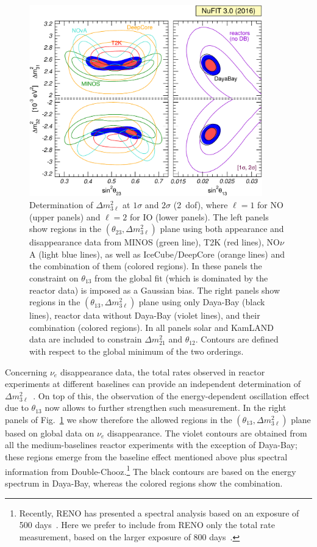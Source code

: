\documentclass[a4paper, 11pt]{article}
\newcommand{\Dmq}{\Delta m^2}
\begin{document}
\begin{figure}\centering
\includegraphics[width=0.9\textwidth]{fig-region-sample}
  \caption{Determination of $\Dmq_{3\ell}$ at $1\sigma$ and $2\sigma$
    (2~dof), where $\ell=1$ for NO (upper panels) and $\ell=2$ for IO
    (lower panels). The left panels show regions in the $(\theta_{23},
    \Dmq_{3\ell})$ plane using both appearance and disappearance data
    from MINOS (green line), T2K (red lines), NO$\nu$A (light blue
    lines), as well as IceCube/DeepCore (orange lines) and the
    combination of them (colored regions). In these panels the
    constraint on $\theta_{13}$ from the global fit (which is
    dominated by the reactor data) is imposed as a Gaussian bias.  The
    right panels show regions in the $(\theta_{13}, \Dmq_{3\ell})$
    plane using only Daya-Bay (black lines), reactor data without
    Daya-Bay (violet lines), and their combination (colored
    regions). In all panels solar and KamLAND data are included to
    constrain $\Dmq_{21}$ and $\theta_{12}$. Contours are defined with
    respect to the global minimum of the two orderings.}
  \label{fig:region-sample}
\end{figure}

Concerning $\nu_e$ disappearance data, the total rates observed in
reactor experiments at different baselines can provide an independent
determination of $\Dmq_{3\ell}$~\cite{Bezerra:2012at,
  GonzalezGarcia:2012sz}.  On top of this, the observation of the
energy-dependent oscillation effect due to $\theta_{13}$ now allows to
further strengthen such measurement.  In the right panels of
Fig.~\ref{fig:region-sample} we show therefore the allowed regions in
the $(\theta_{13}, \Dmq_{3\ell})$ plane based on global data on
$\nu_e$ disappearance. The violet contours are obtained from all the
medium-baselines reactor experiments with the exception of Daya-Bay;
these regions emerge from the baseline effect mentioned above plus
spectral information from Double-Chooz.\footnote{Recently, RENO has
  presented a spectral analysis based on an exposure of 500
  days~\cite{Seo:2016uom}. Here we prefer to include from RENO only
  the total rate measurement, based on the larger exposure of 800
  days~\cite{reno:nu2014}.}  The black contours are based on the
energy spectrum in Daya-Bay, whereas the colored regions show the
combination.
\end{document}
